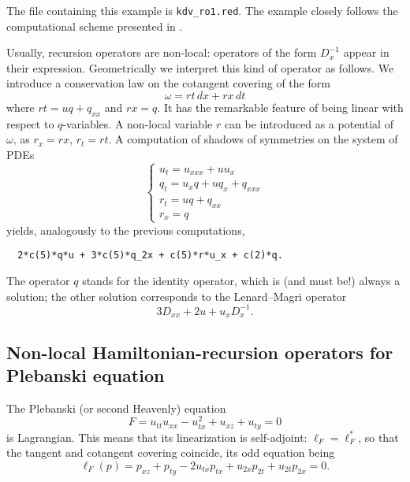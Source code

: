 The file containing this example is \texttt{kdv\_ro1.red}. The example closely
follows the computational scheme presented in \cite{KrasilshchikVerbovetskyVitolo:SPT:2012}.

Usually, recursion operators are non-local: operators of the
form $D_x^{-1}$ appear in their expression. Geometrically we interpret this
kind of operator as follows. We introduce a conservation law on the cotangent
covering of the form
\begin{displaymath}
  \omega = rt\,dx + rx\, dt
\end{displaymath}
where $rt = uq+q_{xx}$ and $rx = q$. It has the remarkable feature of being
linear with respect to $q$-variables. A non-local variable $r$ can be
introduced as a potential of $\omega$, as $r_x=rx$, $r_t=rt$. A computation
of shadows of symmetries on the system of PDEs
\begin{displaymath}
  \left\{\begin{array}{l}
    u_t=u_{xxx}+uu_x\\
    q_t=u_xq + uq_x + q_{xxx}\\
    r_t = uq+q_{xx}\\
    r_x = q
  \end{array}\right.
\end{displaymath}
yields, analogously to the previous computations,
\begin{verbatim}
  2*c(5)*q*u + 3*c(5)*q_2x + c(5)*r*u_x + c(2)*q.
\end{verbatim}
The operator $q$ stands for the identity operator, which is (and must be!)
always a solution; the other solution corresponds to the Lenard--Magri operator
\begin{displaymath}
  3D_{xx} + 2u + u_xD_x^{-1}.
\end{displaymath}

\subsection{Non-local Hamiltonian-recursion operators for
  Plebanski equation}
\label{cdesec:plebanski-equation}

The Plebanski (or second Heavenly) equation
\begin{equation}
  \label{eq:102}
  F=u_{tt}u_{xx}-u_{tx}^2+u_{xz}+u_{ty}=0
\end{equation}
is Lagrangian. This means that its linearization is self-adjoint:
$\ell_F=\ell^*_F$, so that the tangent and cotangent covering coincide, its odd
equation being
\begin{equation}
  \label{eq:24}
  \ell_F(p) = p_{xz} + p_{ty} - 2u_{tx}p_{tx} + u_{2x}p_{2t} + u_{2t}p_{2x} = 0.
\end{equation}

